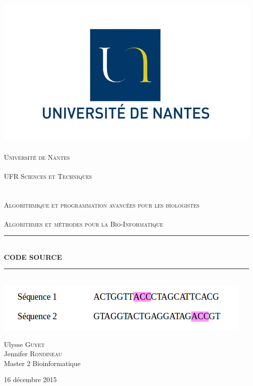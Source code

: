 \setlength{\parindent}{0cm}
\setlength{\parskip}{1ex plus 0.5ex minus 0.2ex}
\newcommand{\hsp}{\hspace{20pt}}
\newcommand{\HRule}{\rule{\linewidth}{0.5mm}}
\begin{titlepage}
  \begin{sffamily}
  \begin{center}

    \includegraphics[scale=0.2]{logo.jpg}~\\[2cm]

    \textsc{\LARGE Université de Nantes}\\
    \textsc{\LARGE  }\\
    \textsc{\Large UFR Sciences et Techniques}\\
    \textsc{\LARGE  }\\
    \textsc{\LARGE  }\\
    \textsc{\Large Algorithmique et programmation avancées pour les biologistes}\\
    \textsc{\LARGE  }\\
    \textsc{\Large Algorithmes et méthodes pour la Bio-Informatique}\\[1cm]

    \HRule \\[0.4cm]
    { \huge \bfseries CODE SOURCE \\[0.4cm]
     }
    \HRule \\[2cm]

     \includegraphics[scale=0.7]{deco.png}~\\[2cm]
    
 
      \begin{center} \large
       Ulysse \textsc{Guyet}\\
       Jennifer \textsc{Rondineau}\\
       Master 2 Bioinformatique \\
      \end{center}

    \vfill

    {\large 16 décembre 2015}

  \end{center}
  \end{sffamily}
\end{titlepage}

